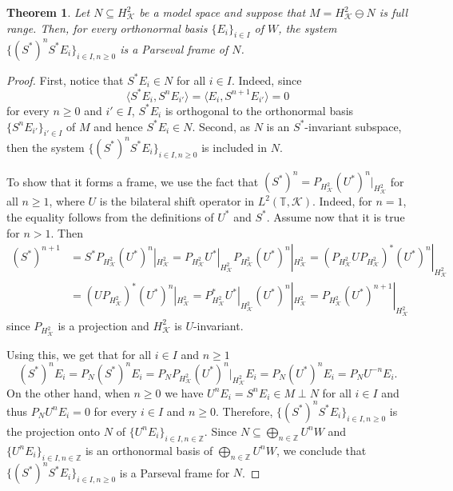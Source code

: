 \documentclass[a4paper,12pt]{amsart}
\def\KK{{\mathcal{K}}}
\def\T{{\mathbb{T}}}
\def\Z{{\mathbb{Z}}}
\newcommand{\scal}[1]{{\langle{#1}\rangle}}
\newtheorem{theorem}{Theorem}[section]
\theoremstyle{definition}
\begin{document}
\begin{theorem}\label{frameN}
Let $N\subseteq H^{2}_{\KK}$ be a model space and suppose that $M=H^{2}_{\KK}\ominus N$ is full range. Then, for every orthonormal basis $\{E_i\}_{i\in I}$ of $W$, the system $\{(S^*)^nS^*E_i\}_{i\in I, n\geqslant0}$ is a Parseval frame of $N$.
\end{theorem}
\begin{proof}
First, notice that $S^*E_i\in N$ for all $i\in I$. Indeed, since
\begin{equation*}
\scal{S^* E_i, S^nE_{i'}}=\scal{E_i, S^{n+1} E_{i'}}=0
\end{equation*}
for every $n\geqslant0$ and $i'\in I$, $S^* E_i$ is orthogonal to the orthonormal basis $\{S^n E_{i'}\}_{i'\in I}$ of $M$ and hence $S^*E_i\in N$. Second, as $N$ is an $S^*$-invariant subspace, then the system $\{(S^*)^nS^*E_i\}_{i\in I,n\geqslant0}$ is included in $N$. 

To show that it forms a frame, we use the fact that $(S^*)^n=P_{H^2_\KK}(U^*)^n|_{H^2_\KK}$ for all $n\geqslant 1$, where $U$ is the bilateral shift operator in $L^2(\T,\KK)$. Indeed, for $n=1$, the equality follows from the definitions of $U^*$ and $S^*$. Assume now that it is true for $n>1$. Then 
\begin{align*}
(S^*)^{n+1}&=S^*P_{H^2_\KK}(U^*)^n|_{H^2_\KK}=P_{H^2_\KK}U^*|_{H^2_\KK}P_{H^2_\KK}(U^*)^n|_{H^2_\KK}=(P_{H^2_\KK}UP_{H^2_\KK})^*(U^*)^n|_{H^2_\KK}\\
&=(UP_{H^2_\KK})^*(U^*)^n|_{H^2_\KK}
=P_{H^2_\KK}^*U^*|_{H^2_\KK}(U^*)^n|_{H^2_\KK}=P_{H^2_\KK}(U^*)^{n+1}|_{H^2_\KK}
\end{align*}
since $P_{H^2_\KK}$ is a projection and $H^2_\KK$ is $U$-invariant. 

Using this, we get that for all $i\in I$ and $n\geqslant1$
\begin{equation*}
(S^*)^nE_i=P_N(S^*)^nE_i=
P_NP_{H^2_\KK}(U^*)^n|_{H^2_\KK}E_i=P_N(U^*)^nE_i=P_NU^{-n}E_i.
\end{equation*}
On the other hand, when $n\geqslant0$ we have $U^nE_i=S^nE_i\in M\perp N$ for all $i\in I$ and thus $P_NU^nE_i=0$ for every $i\in I$ and $n\geqslant0$. Therefore, $\{(S^*)^nS^*E_i\}_{i\in I,n\geqslant0}$ is the projection onto $N$ of $\{U^nE_i\}_{i\in I,n\in\Z}$. Since $N\subseteq\bigoplus_{n\in\Z}U^nW$ and $\{U^nE_i\}_{i\in I,n\in\Z}$ is an orthonormal basis of $\bigoplus_{n\in\Z}U^nW$, we conclude that $\{(S^*)^nS^*E_i\}_{i\in I,n\geqslant0}$ is a Parseval frame for $N$.
\end{proof}
\end{document}
